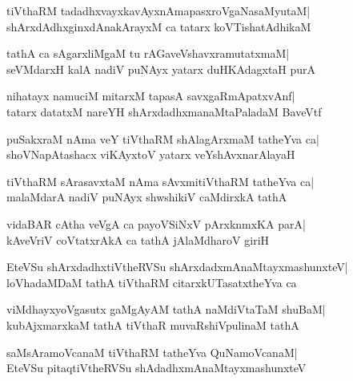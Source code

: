 \documentclass[twoside,12pt,openright]{book}
\newcounter{shloka}[chapter]
\begin{document}
\begin{shloka}%
tiVthaRM tadadhxvayxkavAyxnAmapasxroVgaNasaMyutaM|\\
shArxdAdhxginxdAnakArayxM ca tatarx koVTishatAdhikaM 
\end{shloka}

\begin{shloka}%
tathA ca sAgarxliMgaM tu rAGaveVshavxramutatxmaM|\\
seVMdarxH kalA nadiV puNAyx yatarx duHKAdagxtaH purA
\end{shloka}

\begin{shloka}%
nihatayx namuciM mitarxM tapasA savxgaRmApatxvAnf|\\
tatarx datatxM nareYH shArxdadhxmanaMtaPaladaM BaveVtf
\end{shloka}

\begin{shloka}%
puSakxraM nAma veY tiVthaRM shAlagArxmaM tatheYva ca|\\
shoVNapAtashacx viKAyxtoV yatarx veYshAvxnarAlayaH
\end{shloka}

\begin{shloka}%
tiVthaRM sArasavxtaM nAma sAvxmitiVthaRM tatheYva ca|\\
malaMdarA nadiV puNAyx shwshikiV caMdirxkA tathA
\end{shloka}

\begin{shloka}%
vidaBAR cAtha veVgA ca payoVSiNxV pArxknmxKA parA|\\
kAveVriV coVtatxrAkA ca tathA jAlaMdharoV giriH
\end{shloka}

\begin{shloka}%
EteVSu shArxdadhxtiVtheRVSu shArxdadxmAnaMtayxmashunxteV|\\
loVhadaMDaM tathA tiVthaRM citarxkUTasatxtheYva ca
\end{shloka}

\begin{shloka}%
viMdhayxyoVgasutx gaMgAyAM tathA naMdiVtaTaM shuBaM|\\
kubAjxmarxkaM tathA tiVthaR muvaRshiVpulinaM tathA
\end{shloka}

\begin{shloka}%
saMsAramoVcanaM tiVthaRM tatheYva QuNamoVcanaM|\\
EteVSu pitaqtiVtheRVSu shAdadhxmAnaMtayxmashunxteV
\end{shloka}
\end{document}
